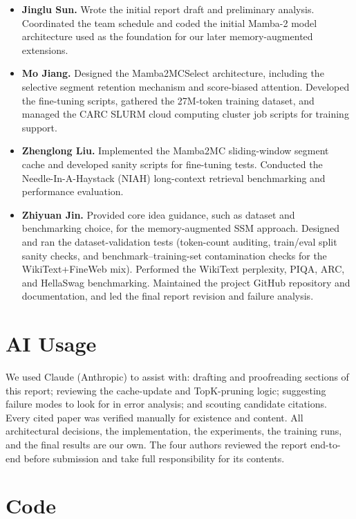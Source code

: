\documentclass{article}
\begin{document}
\begin{itemize}
    \itemsep0pt
    \item \textbf{Jinglu Sun.} Wrote the initial report draft and preliminary analysis. Coordinated the team schedule and coded the initial Mamba-2 model architecture used as the foundation for our later memory-augmented extensions.
    \item \textbf{Mo Jiang.} Designed the Mamba2MCSelect architecture, including the selective segment retention mechanism and score-biased attention. Developed the fine-tuning scripts, gathered the 27M-token training dataset, and managed the CARC SLURM cloud computing cluster job scripts for training support.
    \item \textbf{Zhenglong Liu.} Implemented the Mamba2MC sliding-window segment cache and developed sanity scripts for fine-tuning tests. Conducted the Needle-In-A-Haystack (NIAH) long-context retrieval benchmarking and performance evaluation.
    \item \textbf{Zhiyuan Jin.} Provided core idea guidance, such as dataset and benchmarking choice, for the memory-augmented SSM approach. Designed and ran the dataset-validation tests (token-count auditing, train/eval split sanity checks, and benchmark--training-set contamination checks for the WikiText+FineWeb mix). Performed the WikiText perplexity, PIQA, ARC, and HellaSwag benchmarking. Maintained the project GitHub repository and documentation, and led the final report revision and failure analysis.
\end{itemize}

\section{AI Usage}

We used Claude (Anthropic) to assist with: drafting and proofreading sections of this report; reviewing the cache-update and TopK-pruning logic; suggesting failure modes to look for in error analysis; and scouting candidate citations. Every cited paper was verified manually for existence and content. All architectural decisions, the implementation, the experiments, the training runs, and the final results are our own. The four authors reviewed the report end-to-end before submission and take full responsibility for its contents.




\appendix
\onecolumn

\section{Code}
\end{document}
